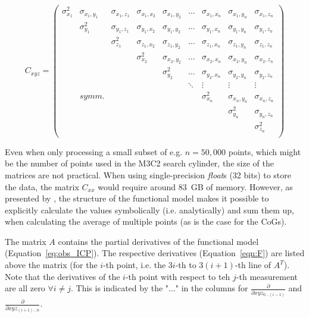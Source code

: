\documentclass[preprint,12pt,3p]{elsarticle}
\begin{document}
\begin{equation}
C_{xyz} = 
    \begin{pmatrix}
    \sigma_{x_1}^2 & \sigma_{x_1, y_1} & \sigma_{x_1, z_1} &  \sigma_{x_1, x_2} & \sigma_{x_1, y_2} & \dots & \sigma_{x_1, x_n} & \sigma_{x_1, y_n} & \sigma_{x_1, z_n}  \\
    
    
     & \sigma_{y_1}^2 & \sigma_{y_1, z_1} &  \sigma_{y_1, x_2} & \sigma_{y_1, y_2} & \dots & \sigma_{y_1, x_n} & \sigma_{y_1, y_n} & \sigma_{y_1, z_n}  \\
    
    
     &  & \sigma_{z_1}^2 &  \sigma_{z_1, x_2} & \sigma_{z_1, y_2} & \dots & \sigma_{z_1, x_n}& \sigma_{z_1, y_n} & \sigma_{z_1, z_n}  \\
    
    
     &  &  & \sigma_{x_2}^2 &  \sigma_{x_2, y_2}  & \dots & \sigma_{x_2, x_n}& \sigma_{x_2, y_n} & \sigma_{x_2, z_n}  \\
     &  &  & & \sigma_{y_2}^2 & \dots & \sigma_{y_2, x_n}& \sigma_{y_2, y_n} & \sigma_{y_2, z_n}  \\
     
    
     &  &  &  & & \ddots & \vdots & \vdots & \vdots 
     \\
     &symm. & & & & & \sigma_{x_n}^2 & \sigma_{x_n, y_n} & \sigma_{x_n, z_n} \\
     &  &  &  & & &  & \sigma_{y_n}^2 & \sigma_{y_n, z_n} \\
     &  &  &  & & &  &  & \sigma_{z_n}^2 \\
    \end{pmatrix}
    \label{eq:C_xx}
\end{equation}

Even when only processing a small subset of e.g. $n=50,000$ points, which might be the number of points used in the M3C2 search cylinder, the size of the matrices are not practical. When using single-precision \emph{float}s (32 bits) to store the data, the matrix $C_{xx}$ would require around \SI{83}{GB} of memory. 
However, as presented by \citet{winiwarterherausforderungen}, the structure of the functional model makes it possible to explicitly calculate the values symbolically (i.e. analytically) and sum them up, when calculating the average of multiple points (as is the case for the CoGs).

The matrix $A$ contains the partial derivatives of the functional model (Equation~\ref{eq:obs_ICP}). The respective derivatives (Equation~\ref{eqn:F}) are listed above the matrix (for the $i$-th point, i.e. the $3i$-th to $3(i+1)$-th line of $A^T$). Note that the derivatives of the $i$-th point with respect to teh $j$-th measurement are all zero $\forall i \neq j$. This is indicated by the "$\dots$" in the columns for $\frac{\partial}{\partial xyz_{0...(i-1)}} $ and $\frac{\partial}{\partial xyz_{(i+1)...n}}$.
     
\end{document}
